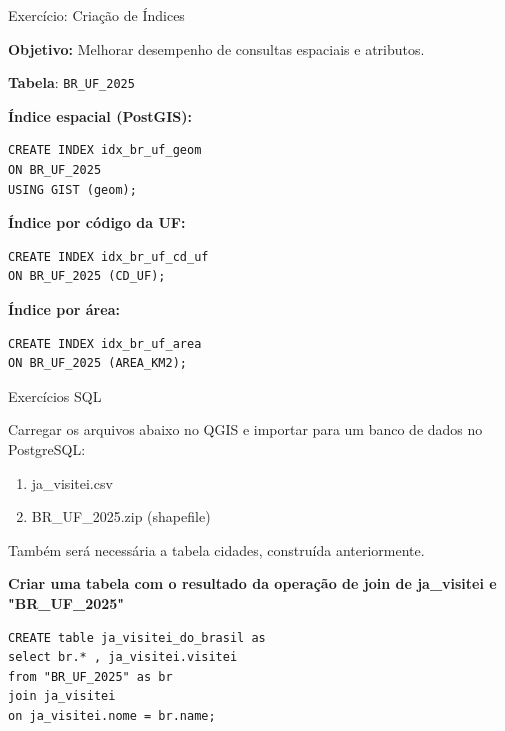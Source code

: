\documentclass{beamer}
\begin{document}
\begin{frame}[fragile]{Exercício: Criação de Índices }

\textbf{Objetivo:}
Melhorar desempenho de consultas espaciais e atributos.

\textbf{Tabela}: \texttt{BR\_UF\_2025}

\vspace{0.4cm}

\textbf{Índice espacial (PostGIS):}

\begin{verbatim}
CREATE INDEX idx_br_uf_geom
ON BR_UF_2025
USING GIST (geom);
\end{verbatim}

\vspace{0.4cm}

\textbf{Índice por código da UF:}

\begin{verbatim}
CREATE INDEX idx_br_uf_cd_uf
ON BR_UF_2025 (CD_UF);
\end{verbatim}

\vspace{0.3cm}

\textbf{Índice por área:}

\begin{verbatim}
CREATE INDEX idx_br_uf_area
ON BR_UF_2025 (AREA_KM2);
\end{verbatim}

\end{frame}

\begin{frame}[fragile]{Exercícios SQL}
    
    Carregar os arquivos abaixo no QGIS e importar para um banco de dados no PostgreSQL:
    \begin{enumerate}
\item ja\_visitei.csv
\item BR\_UF\_2025.zip (shapefile)
    \end{enumerate}
    Também será necessária a tabela cidades, construída anteriormente.

    \vspace{0.3cm}
    \textbf{Criar uma tabela com o resultado da operação de join de ja\_visitei e "BR\_UF\_2025" }
    \pause
    \begin{verbatim}
CREATE table ja_visitei_do_brasil as
select br.* , ja_visitei.visitei
from "BR_UF_2025" as br
join ja_visitei
on ja_visitei.nome = br.name;
    \end{verbatim}
   
\end{frame}
\end{document}
